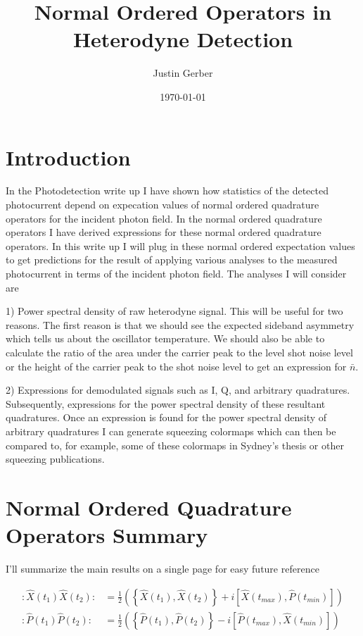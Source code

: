 \documentclass[12pt]{article}
\begin{document}
\title{Normal Ordered Operators in Heterodyne Detection}
\author{Justin Gerber}
\date{\today}
\maketitle

\section{Introduction}

In the Photodetection write up I have shown how statistics of the detected photocurrent depend on expecation values of normal ordered quadrature operators for the incident photon field. In the normal ordered quadrature operators I have derived expressions for these normal ordered quadrature operators. In this write up I will plug in these normal ordered expectation values to get predictions for the result of applying various analyses to the measured photocurrent in terms of the incident photon field. The analyses I will consider are 

1) Power spectral density of raw heterodyne signal. This will be useful for two reasons. The first reason is that we should see the expected sideband asymmetry which tells us about the oscillator temperature. We should also be able to calculate the ratio of the area under the carrier peak to the level shot noise level or the height of the carrier peak to the shot noise level to get an expression for $\bar{n}$.

2) Expressions for demodulated signals such as I, Q, and arbitrary quadratures. Subsequently, expressions for the power spectral density of these resultant quadratures. Once an expression is found for the power spectral density of arbitrary quadratures I can generate squeezing colormaps which can then be compared to, for example, some of these colormaps in Sydney's thesis or other squeezing publications.

\clearpage

\section{Normal Ordered Quadrature Operators Summary}
I'll summarize the main results on a single page for easy future reference

\begin{align}
:\hat{X}(t_1)\hat{X}(t_2): &= \frac{1}{2}\left(\left\{\hat{X}(t_1),\hat{X}(t_2)\right\} + i \left[\hat{X}(t_{max}),\hat{P}(t_{min})\right]\right)\\
:\hat{P}(t_1)\hat{P}(t_2): &= \frac{1}{2}\left(\left\{\hat{P}(t_1),\hat{P}(t_2)\right\} - i \left[\hat{P}(t_{max}),\hat{X}(t_{min})\right]\right)
\end{align}
\end{document}
